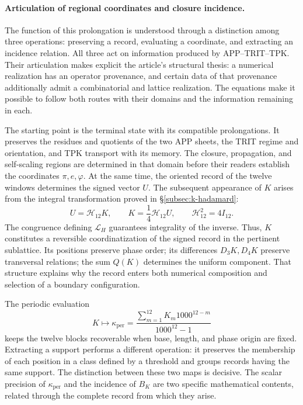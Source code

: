 \paragraph{Articulation of regional coordinates and closure incidence.}
\label{inc-ampl-articulacion}
The function of this prolongation is understood through a distinction
among three operations: preserving a record, evaluating a coordinate, and
extracting an incidence relation. All three act on information
produced by APP--TRIT--TPK. Their articulation makes explicit the article's
structural thesis: a numerical realization has an operator
provenance, and certain data of that provenance additionally admit a
combinatorial and lattice realization. The equations make it possible to follow both
routes with their domains and the information remaining in each.

The starting point is the terminal state with its compatible
prolongations. It preserves the residues and quotients of the two APP
sheets, the TRIT regime and orientation, and TPK transport with its memory.
The closure, propagation, and self-scaling regions are determined in that
domain before their readers establish the coordinates
$\pi,e,\varphi$. At the same time, the oriented record of the twelve
windows determines the signed vector $U$. The subsequent appearance of $K$
arises from the integral transformation proved in
\S\ref{subsec:k-hadamard}:
\begin{equation}
 U=\mathcal H_{12}K,\qquad
 K=\frac14\mathcal H_{12}U,\qquad
 \mathcal H_{12}^{2}=4I_{12}.
 \label{inc-ampl-registro}
\end{equation}
The congruence defining $\mathcal L_H$ guarantees integrality of
the inverse. Thus, $K$ constitutes a reversible coordinatization
of the signed record in the pertinent sublattice. Its positions preserve
phase order; its differences $D_3K,D_4K$ preserve transversal
relations; the sum $Q(K)$ determines the uniform component. That
structure explains why the record enters both numerical
composition and selection of a boundary configuration.

The periodic evaluation
\[
 K\longmapsto\kappa_{\mathrm{per}}
 =\frac{\sum_{m=1}^{12}K_m1000^{12-m}}{1000^{12}-1}
\]
keeps the twelve blocks recoverable when base, length, and phase origin
are fixed. Extracting a support performs a different
operation: it preserves the membership of each position in a class defined
by a threshold and groups records having the same support. The
distinction between these two maps is decisive. The scalar
precision of $\kappa_{\mathrm{per}}$ and the incidence of $B_K$ are two
specific mathematical contents, related through the complete record
from which they arise.
